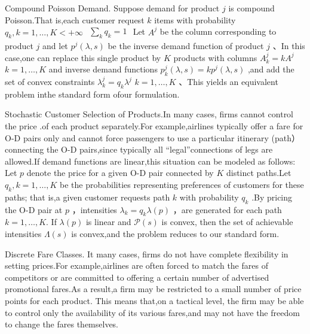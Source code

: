 Compound Poisson Demand. Suppose demand for product \(j\) is compound
Poisson.That is,each customer request \(k\) items with probability
\(q _ { k } , k = 1 , \ldots , K < + \infty\)
\(\begin{array} { r } { \sum _ { k } q _ { k } = 1 } \end{array}\) Let
\(A ^ { j }\) be the column corresponding to product \(j\) and let
\(p ^ { j } ( \lambda , s )\) be the inverse demand function of product
\(j\) 、In this case,one can replace this single product by \(K\)
products with columns \(A _ { k } ^ { j } = k A ^ { j }\)
\(k = 1 , \dots , K\) and inverse demand functions
\(p _ { k } ^ { j } ( \lambda , s ) = k p ^ { j } ( \lambda , s )\) ,and
add the set of convex constraints
\(\lambda _ { k } ^ { j } = q _ { k } \lambda ^ { j }\)
\(k = 1 , \ldots , K\) 、This yields an equivalent problem inthe
standard form ofour formulation.

Stochastic Customer Selection of Products.In many cases, firms cannot
control the price .of each product separately.For example,airlines
typically offer a fare for O-D pairs only and cannot force passengers to
use a particular itinerary (path） connecting the O-D pairs,since
typically all ``legal''connections of legs are allowed.If demand
functions are linear,this situation can be modeled as follows: Let \(p\)
denote the price for a given O-D pair connected by \(K\) distinct
paths.Let \(q _ { k } , k = 1 , \ldots , K\) be the probabilities
representing preferences of customers for these paths; that is,a given
customer requests path \(k\) with probability \(q _ { k }\) .By pricing
the O-D pair at \(p\) ，intensities
\(\lambda _ { k } = q _ { k } \lambda ( p )\) ，are generated for each
path \(k = 1 , \ldots , K .\) If \(\lambda ( p )\) is linear and
\(\mathcal { P } ( s )\) is convex, then the set of achievable
intensities \(\Lambda ( s )\) is convex,and the problem reduces to our
standard form.

Discrete Fare Classes. It many cases, firms do not have complete
flexibility in setting prices.For example,airlines are often forced to
match the fares of competitors or are committed to offering a certain
number of advertised promotional fares.As a result,a firm may be
restricted to a small number of price points for each product. This
means that,on a tactical level, the firm may be able to control only the
availability of its various fares,and may not have the freedom to change
the fares themselves.

